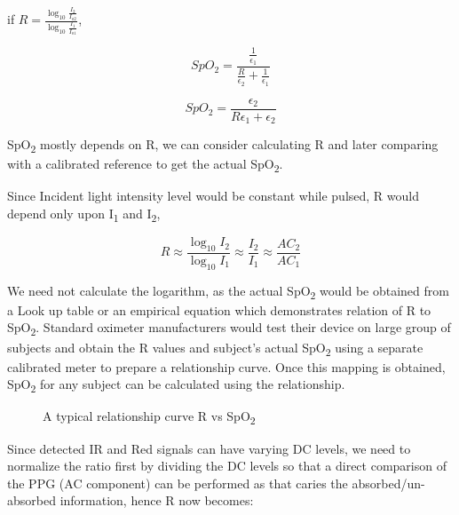 	if $R = \frac{\log_{10}\frac{I_2}{I_{o2}}}{\log_{10}\frac{I_1}{I_{o1}}}$,
	
	\[	
	SpO_2 = \frac{\frac{1}{\epsilon_1}}{\frac{R}{\epsilon_2} + \frac{1}{\epsilon_1}}
	\]	
	
	\begin{equation}
		SpO_2 = \frac{\epsilon_2}{R\epsilon_1 + \epsilon_2}
	\end{equation}	


	SpO\textsubscript{2} mostly depends on R, we can consider calculating R and later comparing with a calibrated reference to get the actual SpO\textsubscript{2}.
	
	Since Incident light intensity level would be constant while pulsed, R would depend only upon I\textsubscript{1} and I\textsubscript{2},

	\[
	R \approx \frac{\log_{10}{I_2}}{\log_{10}{I_1}} \approx \frac{I_2}{I_1} \approx \frac{AC_2}{AC_1}
	\]		
	
	We need not calculate the logarithm, as the actual SpO\textsubscript{2} would be obtained from a Look up table or an empirical equation which demonstrates relation of R to SpO\textsubscript{2}. Standard oximeter manufacturers would test their device on large group of subjects and obtain the R values and subject's actual SpO\textsubscript{2} using a separate calibrated meter to prepare a relationship curve. Once this mapping is obtained, SpO\textsubscript{2} for any subject can be calculated using the relationship.
	
	\begin{figure}[ht!]
	\centering	
	\caption{A typical relationship curve R vs SpO\textsubscript{2}}
	\label{fig:curve}
	\end{figure}

	Since detected IR and Red signals can have varying DC levels, we need to normalize the ratio first by dividing the DC levels so that a direct comparison of the PPG (AC component) can be performed as that caries the absorbed/un-absorbed information, hence R now becomes:

